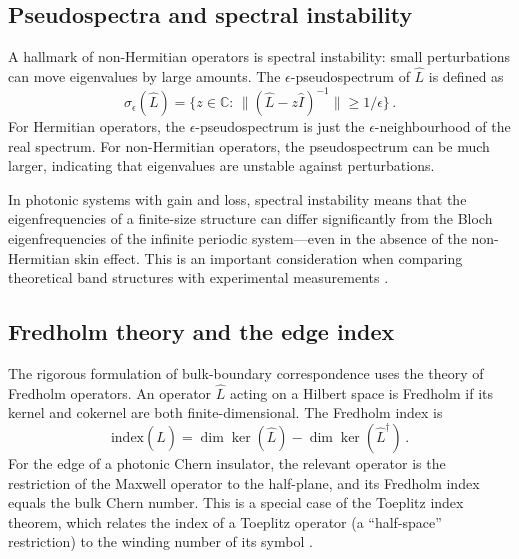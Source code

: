 \subsection{Pseudospectra and spectral instability}
\label{sec:appA-pseudospectra}

A hallmark of non-Hermitian operators is spectral instability: small
perturbations can move eigenvalues by large amounts.  The
$\epsilon$-pseudospectrum of $\hat{L}$ is defined as
\begin{equation}\label{eq:appA-pseudospectrum}
  \sigma_\epsilon(\hat{L}) = \bigl\{z\in\mathbb{C}:\,
  \|(\hat{L}-z\hat{I})^{-1}\| \geq 1/\epsilon\bigr\}\,.
\end{equation}
For Hermitian operators, the $\epsilon$-pseudospectrum is just the
$\epsilon$-neighbourhood of the real spectrum.  For non-Hermitian
operators, the pseudospectrum can be much larger, indicating that
eigenvalues are unstable against perturbations.

In photonic systems with gain and loss, spectral instability means
that the eigenfrequencies of a finite-size structure can differ
significantly from the Bloch eigenfrequencies of the infinite
periodic system---even in the absence of the non-Hermitian skin
effect.  This is an important consideration when comparing
theoretical band structures with experimental measurements
\cite{wang2021topological,longhi2019probing}.

\subsection{Fredholm theory and the edge index}
\label{sec:appA-fredholm}

The rigorous formulation of bulk-boundary correspondence uses the
theory of Fredholm operators.  An operator $\hat{L}$ acting on a
Hilbert space is Fredholm if its kernel and cokernel are both
finite-dimensional.  The Fredholm index is
\begin{equation}\label{eq:appA-fredholm-index}
  \mathrm{index}(\hat{L}) = \dim\ker(\hat{L})
  - \dim\ker(\hat{L}^\dagger)\,.
\end{equation}
For the edge of a photonic Chern insulator, the relevant operator is
the restriction of the Maxwell operator to the half-plane, and its
Fredholm index equals the bulk Chern number.  This is a special case
of the Toeplitz index theorem, which relates the index of a Toeplitz
operator (a ``half-space'' restriction) to the winding number of its
symbol \cite{asbth2016berry}.

